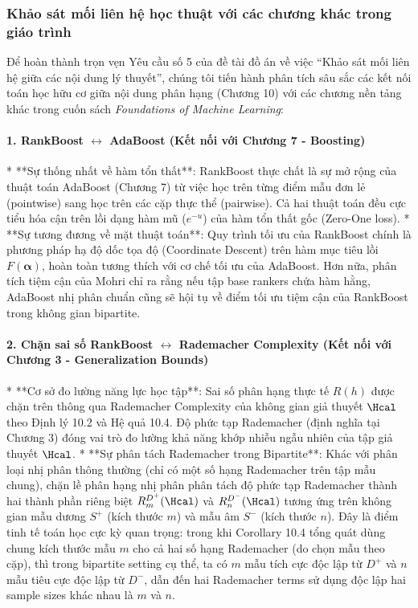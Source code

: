 \subsubsection{Khảo sát mối liên hệ học thuật với các chương khác trong giáo trình}
\label{sec:connections}

Để hoàn thành trọn vẹn Yêu cầu số 5 của đề tài đồ án về việc ``Khảo sát mối liên hệ giữa các nội dung lý thuyết'', chúng tôi tiến hành phân tích sâu sắc các kết nối toán học hữu cơ giữa nội dung phân hạng (Chương 10) với các chương nền tảng khác trong cuốn sách \textit{Foundations of Machine Learning}:

\paragraph{1. RankBoost $\leftrightarrow$ AdaBoost (Kết nối với Chương 7 - Boosting)}
* **Sự thống nhất về hàm tổn thất**: RankBoost thực chất là sự mở rộng của thuật toán AdaBoost (Chương 7) từ việc học trên từng điểm mẫu đơn lẻ (pointwise) sang học trên các cặp thực thể (pairwise). Cả hai thuật toán đều cực tiểu hóa cận trên lồi dạng hàm mũ ($e^{-u}$) của hàm tổn thất gốc (Zero-One loss).
* **Sự tương đương về mặt thuật toán**: Quy trình tối ưu của RankBoost chính là phương pháp hạ độ dốc tọa độ (Coordinate Descent) trên hàm mục tiêu lồi $F(\bm{\alpha})$, hoàn toàn tương thích với cơ chế tối ưu của AdaBoost. Hơn nữa, phân tích tiệm cận của Mohri chỉ ra rằng nếu tập base rankers chứa hàm hằng, AdaBoost nhị phân chuẩn cũng sẽ hội tụ về điểm tối ưu tiệm cận của RankBoost trong không gian bipartite.

\paragraph{2. Chặn sai số RankBoost $\leftrightarrow$ Rademacher Complexity (Kết nối với Chương 3 - Generalization Bounds)}
* **Cơ sở đo lường năng lực học tập**: Sai số phân hạng thực tế $R(h)$ được chặn trên thông qua Rademacher Complexity của không gian giả thuyết $\Hcal$ theo Định lý 10.2 và Hệ quả 10.4. Độ phức tạp Rademacher (định nghĩa tại Chương 3) đóng vai trò đo lường khả năng khớp nhiễu ngẫu nhiên của tập giả thuyết $\Hcal$.
* **Sự phân tách Rademacher trong Bipartite**: Khác với phân loại nhị phân thông thường (chỉ có một số hạng Rademacher trên tập mẫu chung), chặn lề phân hạng nhị phân phân tách độ phức tạp Rademacher thành hai thành phần riêng biệt $R^{D^+}_m(\Hcal)$ và $R^{D^-}_n(\Hcal)$ tương ứng trên không gian mẫu dương $S^+$ (kích thước $m$) và mẫu âm $S^-$ (kích thước $n$). Đây là điểm tinh tế toán học cực kỳ quan trọng: trong khi Corollary 10.4 tổng quát dùng chung kích thước mẫu $m$ cho cả hai số hạng Rademacher (do chọn mẫu theo cặp), thì trong bipartite setting cụ thể, ta có $m$ mẫu tích cực độc lập từ $D^+$ và $n$ mẫu tiêu cực độc lập từ $D^-$, dẫn đến hai Rademacher terms sử dụng độc lập hai sample sizes khác nhau là $m$ và $n$.

